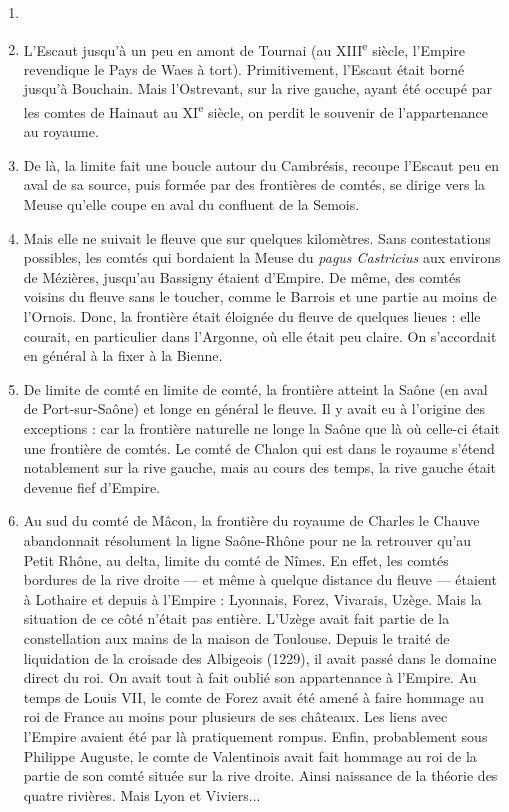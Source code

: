 \documentclass[french,twoside]{book} %
\begin{document}
\begin{enumerate}[itemsep=0pt,]
\item[] \hspace{-1.5em}{\bfseries Ces limites sont :}
\item L’Escaut jusqu’à un peu en amont de Tournai (au XIII\textsuperscript{e} siècle, l’Empire revendique le Pays de Waes à tort). Primitivement, l’Escaut était borné jusqu’à Bouchain. Mais l’Ostrevant, sur la rive gauche, ayant été occupé par les comtes de Hainaut au XI\textsuperscript{e} siècle, on perdit le souvenir de l’appartenance au royaume.
\item De là, la limite fait une boucle autour du Cambrésis, recoupe l’Escaut peu en aval de sa source, puis formée par des frontières de comtés, se dirige vers la Meuse qu’elle coupe en aval du confluent de la Semois.
\item Mais elle ne suivait le fleuve que sur quelques kilomètres. Sans contestations possibles, les comtés qui bordaient la Meuse du {\itshape pagus Castricius} aux environs de Mézières, jusqu’au Bassigny étaient d’Empire. De même, des comtés voisins du fleuve sans le toucher, comme le Barrois et une partie au moins de l’Ornois. Donc, la frontière était éloignée du fleuve de quelques lieues : elle courait, en particulier dans l’Argonne, où elle était peu claire. On s’accordait en général à la fixer à la Bienne.
\item De limite de comté en limite de comté, la frontière atteint la Saône (en aval de Port-sur-Saône) et longe en général le fleuve. Il y avait eu à l’origine des exceptions : car la frontière naturelle ne longe la Saône que là où celle-ci était une frontière de comtés. Le comté de Chalon qui est dans le royaume s’étend notablement sur la rive gauche, mais au cours des temps, la rive gauche était devenue fief d’Empire.
\item Au sud du comté de Mâcon, la frontière du royaume de Charles le Chauve abandonnait résolument la ligne Saône-Rhône pour ne la retrouver qu’au Petit Rhône, au delta, limite du comté de Nîmes. En effet, les comtés bordures de la rive droite — et même à quelque distance du fleuve — étaient à Lothaire et depuis à l’Empire : Lyonnais, Forez, Vivarais, Uzège. Mais la situation de ce côté n’était pas entière. L’Uzège avait fait partie de la constellation aux mains de la  
\label{p8} maison de Toulouse. Depuis le traité de liquidation de la croisade des Albigeois (1229), il avait passé dans le domaine direct du roi. On avait tout à fait oublié son appartenance à l’Empire. Au temps de Louis VII, le comte de Forez avait été amené à faire hommage au roi de France au moins pour plusieurs de ses châteaux. Les liens avec l’Empire avaient été par là pratiquement rompus. Enfin, probablement sous Philippe Auguste, le comte de Valentinois avait fait hommage au roi de la partie de son comté située sur la rive droite. Ainsi naissance de la théorie des quatre rivières. Mais Lyon et Viviers...

\end{enumerate}
\end{document}
